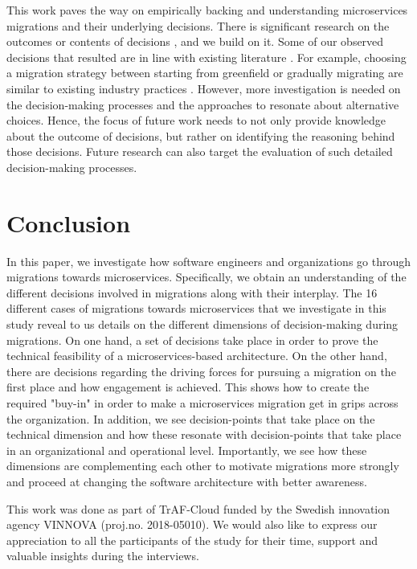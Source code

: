 \documentclass[sigconf,dvipsnames]{acmart}
\begin{document}
This work paves the way on empirically backing and understanding microservices migrations and their underlying decisions. 
There is significant research on the outcomes or contents of decisions \cite{Hassan2020}, and we build on it. 
Some of our observed decisions that resulted are in line with existing literature \cite{SOLDANI2018215}. For example, choosing a migration strategy between starting from greenfield or gradually migrating are similar to existing industry practices \cite{newman2019monolith}. 
However, more investigation is needed on the decision-making processes and the approaches to resonate about alternative choices. 
Hence, the focus of future work needs to not only provide knowledge about the outcome of decisions, but rather on identifying the reasoning behind those decisions. %
Future research can also target the evaluation of such detailed decision-making processes.  


\section{Conclusion}

In this paper, we investigate how software engineers and organizations go through migrations towards microservices. Specifically, we obtain an understanding of the different decisions involved in migrations along with their interplay.
The 16 different cases of migrations towards microservices that we investigate in this study reveal to us details on the different dimensions of decision-making during migrations.
On one hand, a set of decisions take place in order to prove the technical feasibility of a microservices-based architecture.
On the other hand, there are decisions regarding the driving forces for pursuing a migration on the first place and how engagement is achieved. This shows how to create the required "buy-in" in order to make a microservices migration get in grips across the organization.
In addition, we see decision-points that take place on the technical dimension and how these resonate with decision-points that take place in an organizational and operational level. Importantly, we see how these dimensions are complementing each other to motivate migrations more strongly and proceed at changing the software architecture with better awareness. 

\begin{acks}
This work was done as part of TrAF-Cloud funded by the Swedish innovation agency VINNOVA (proj.no. 2018-05010). We would also like to express our appreciation to all the participants of the study for their time, support and valuable insights during the interviews. 
\end{acks}



\end{document}
